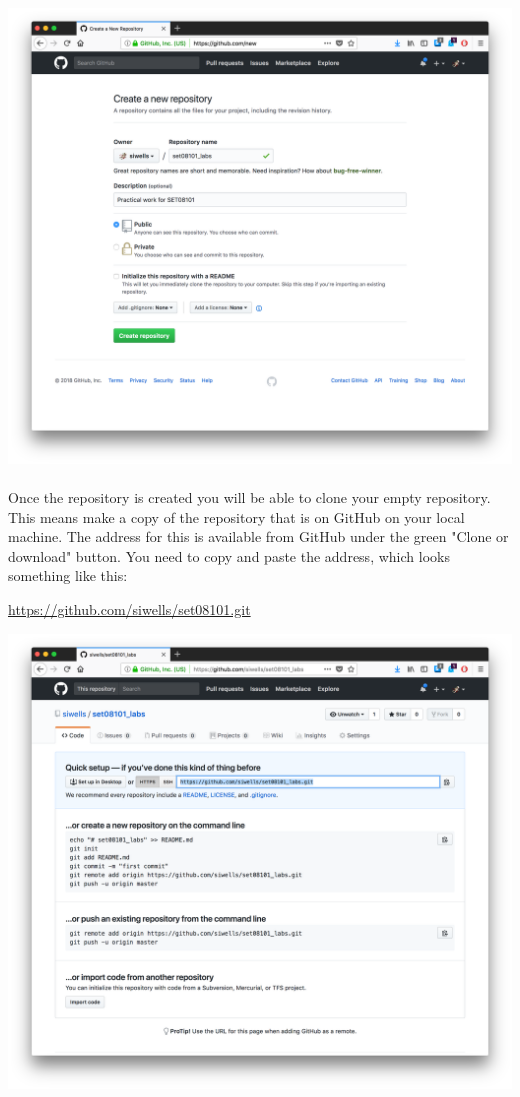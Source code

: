 \documentclass[10pt, a4paper, twosize]{article}
\begin{document}
\includegraphics[width=.8\textwidth]{images/github-new-repo}

\paragraph{} Once the repository is created you will be able to clone your empty repository. This means make a copy of the repository that is on GitHub on your local machine. The address for this is available from GitHub under the green "Clone or download" button. You need to copy and paste the address, which looks something like this:

    \url{https://github.com/siwells/set08101.git}


\includegraphics[width=.8\textwidth]{images/github-clone-url}
\end{document}
